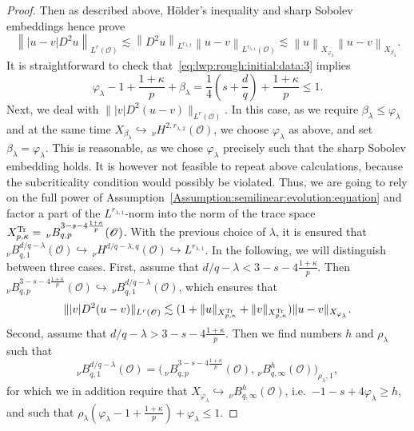 \documentclass[reqno]{amsart}
\newcommand{\sO}{\mathscr{O}}
\newcommand{\1}{\mathbf{1}}
\newcommand{\nH}{\ensuremath{\,_\nu H}}
\newcommand{\bpsn}[1]{\ensuremath{\nH^{#1}(\sO)}}
\newcommand{\nrm}[1]{\left\lVert #1 \right\rVert}
\begin{document}
\begin{proof}
        Then as described above, Hölder's inequality and sharp Sobolev embeddings hence prove
        \[\nrm{|u-v| D^2u}_{L^r(\sO)}\lesssim\nrm{D^2 u}_{L^{r_{\lambda,2}}}\nrm{u-v}_{L^{r_{\lambda,1}}(\sO)}\lesssim \nrm{u}_{X_{\varphi_\lambda}} \nrm{u-v}_{X_{\beta_\lambda}}. \]
        It is straightforward to check that~\eqref{eq:lwp:rough:initial:data:3} implies
        \begin{equation}
        	\varphi_\lambda -1+\frac{1+\kappa}{p}+\beta_\lambda = \frac{1}{4}(s+\frac{d}{q})+\frac{1+\kappa}{p} \le 1.
        \end{equation}
        Next, we deal with  $\||v|D^2(u-v)\|_{L^{r}(\sO)}$. 
        In this case, as we require $\beta_\lambda \le \varphi_\lambda$ and at the same time $X_{\beta_{\lambda}}\hookrightarrow \bpsn{2,r_{\lambda,2}}$, we choose $\varphi_\lambda$ as above, and set $\beta_\lambda=\varphi_\lambda$. This is reasonable, as we chose $\varphi_\lambda$ precisely such that the sharp Sobolev embedding holds.  It is however not feasible to repeat above calculations, because the subcriticality condition would possibly be violated. 
        Thus, we are going to rely on the full power of Assumption~\ref{Assumption:semilinear:evolution:equation} and factor a part of the $L^{r_{\lambda,1}}$-norm into the norm of the trace space
         $X_{p,\kappa}^{\textup{Tr}}=\,_\nu B^{3-s-4\frac{1+\kappa}{p}}_{q,p}(\sO)$. 
         With the previous choice of $\lambda$, it is ensured that $_\nu B_{q,1}^{d/q-\lambda}(\sO)\hookrightarrow\bpsn{d/q-\lambda,q}\hookrightarrow L^{r_{\lambda,1}}$. 
         In the following, we will distinguish between three cases. 
            First, assume that $d/q-\lambda <  3-s-4\frac{1+\kappa}{p}$. Then $_\nu B_{q,p}^{3-s-4\frac{1+\kappa}{p}}(\sO)\hookrightarrow\,_\nu B_{q,1}^{d/q-\lambda}(\sO)$, which ensures that
            \[\||v|D^2(u-v)\|_{L^{r}(\sO)}\lesssim (1+\|u\|_{X_{p,\kappa}^{\textup{Tr}}}+\|v\|_{X_{p,\kappa}^{\textup{Tr}}})\|u-v \|_{X_{\varphi_\lambda}}.\]
            Second, assume that $d/q-\lambda> 3-s-4\frac{1+\kappa}{p}$. Then we find numbers $h$ and $\rho_\lambda$ such that 
            \begin{equation*}_\nu B_{q,1}^{d/q-\lambda}(\sO)=\big(\,_\nu B^{3-s-4\frac{1+\kappa}{p}}_{q,p}(\sO), \,_\nu B^{h}_{q,\infty}(\sO)\big)_{\rho_\lambda,1},
            \end{equation*}for which we in addition require that $X_{\varphi_\lambda}\hookrightarrow \,_\nu B_{q,\infty}^{h}(\sO)$, i.e.\ $-1-s+4\varphi_\lambda \ge h$, and such that $\rho_\lambda(\varphi_\lambda-1+\frac{1+\kappa}{p})+\varphi_\lambda\le 1$. 

\end{proof}
\end{document}
